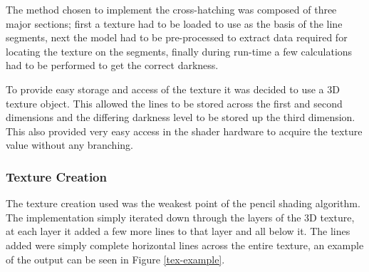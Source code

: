     The method chosen to implement the cross-hatching was composed of three
    major sections; first a texture had to be loaded to use as the basis of the
    line segments, next the model had to be pre-processed to extract data
    required for locating the texture on the segments, finally during run-time a
    few calculations had to be performed to get the correct darkness.

    To provide easy storage and access of the texture it was decided to use a 3D
    texture object.  This allowed the lines to be stored across the first and
    second dimensions and the differing darkness level to be stored up the third
    dimension.  This also provided very easy access in the shader hardware to
    acquire the texture value without any branching.

    \subsubsection{Texture Creation}
      
      The texture creation used was the weakest point of the pencil shading
      algorithm.  The implementation simply iterated down through the layers of
      the 3D texture, at each layer it added a few more lines to that layer and
      all below it.  The lines added were simply complete horizontal lines
      across the entire texture, an example of the output can be seen in Figure
      \ref{tex-example}.

